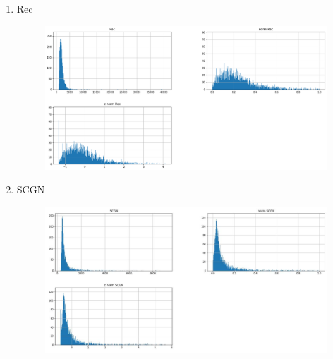\documentclass[11pt]{article}
\begin{document}
\begin{enumerate}
\begin{figure}[h!]
\end{figure}
\newpage
\item Rec
\begin{figure}[h!]
  \includegraphics[width=\linewidth]{hist/Rec.png}
\end{figure}
\item SCGN
\begin{figure}[h!]
  \includegraphics[width=\linewidth]{hist/SCGN.JPG}
\end{figure}
\end{enumerate}
\end{document}
